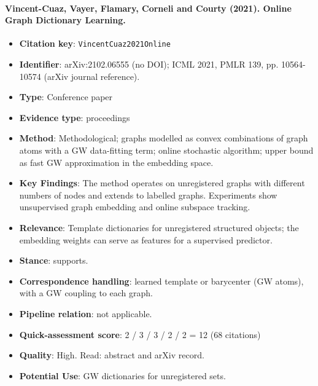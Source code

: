 \documentclass[journal,onecolumn]{IEEEtran}
\begin{document}
\paragraph{Vincent-Cuaz, Vayer, Flamary, Corneli and Courty (2021). Online Graph Dictionary Learning.~\cite{VincentCuaz2021Online}}\mbox{}

\begin{itemize}

\item{} \textbf{Citation key}: \texttt{VincentCuaz2021Online}

\item{} \textbf{Identifier}: arXiv:2102.06555 (no DOI); ICML 2021, PMLR 139, pp. 10564-10574 (arXiv journal reference).

\item{} \textbf{Type}: Conference paper

\item{} \textbf{Evidence type}: proceedings

\item{} \textbf{Method}: Methodological; graphs modelled as convex combinations of graph atoms with a GW data-fitting term; online stochastic algorithm; upper bound as fast GW approximation in the embedding space.

\item{} \textbf{Key Findings}: The method operates on unregistered graphs with different numbers of nodes and extends to labelled graphs. Experiments show unsupervised graph embedding and online subspace tracking.

\item{} \textbf{Relevance}: Template dictionaries for unregistered structured objects; the embedding weights can serve as features for a supervised predictor.

\item{} \textbf{Stance}: supports.

\item{} \textbf{Correspondence handling}: learned template or barycenter (GW atoms), with a GW coupling to each graph.

\item{} \textbf{Pipeline relation}: not applicable.

\item{} \textbf{Quick-assessment score}: 2 / 3 / 3 / 2 / 2 = 12 (68 citations)

\item{} \textbf{Quality}: High. Read: abstract and arXiv record.

\item{} \textbf{Potential Use}: GW dictionaries for unregistered sets.

\end{itemize}
\end{document}
